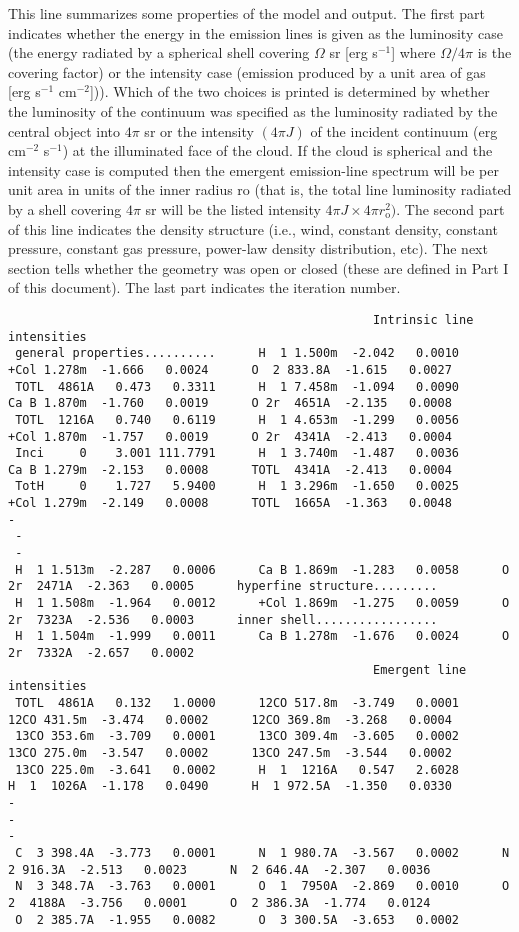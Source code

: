 This line summarizes some properties of the model and output.
The first
part indicates whether the energy in the emission lines is given as the
luminosity case (the energy radiated by a spherical shell covering
$\Omega$ sr [erg s$^{-1}$] where $\Omega/4\pi$ is the covering factor)
or the intensity case (emission
produced by a unit area of gas [erg s$^{-1}$ cm$^{-2}$])).
Which of the two choices
is printed is determined by whether the luminosity of the continuum was
specified as the luminosity radiated by the central object into $4\pi$ sr
or
the intensity $(4\pi J)$ of the incident continuum (erg cm$^{-2}$ s$^{-1}$) at the
illuminated face of the cloud.
If the cloud is spherical and the intensity
case is computed then the emergent emission-line spectrum will be per unit
area in units of the inner radius ro (that is, the total line luminosity
radiated by a shell covering $4\pi$ sr will be the listed intensity
$4\pi J \times 4\pi r_{\mathrm{o}}^2)$.
The second part of this line indicates the density structure (i.e.,
wind, constant density, constant pressure, constant gas pressure, power-law
density distribution, etc).
The next section tells whether the geometry
was open or closed (these are defined in Part I of this document).
The last part indicates the iteration number.
{\setverbatimfontsize{\tiny}
\begin{verbatim}
                                                   Intrinsic line intensities
 general properties..........      H  1 1.500m  -2.042   0.0010      +Col 1.278m  -1.666   0.0024      O  2 833.8A  -1.615   0.0027
 TOTL  4861A   0.473   0.3311      H  1 7.458m  -1.094   0.0090      Ca B 1.870m  -1.760   0.0019      O 2r  4651A  -2.135   0.0008
 TOTL  1216A   0.740   0.6119      H  1 4.653m  -1.299   0.0056      +Col 1.870m  -1.757   0.0019      O 2r  4341A  -2.413   0.0004
 Inci     0    3.001 111.7791      H  1 3.740m  -1.487   0.0036      Ca B 1.279m  -2.153   0.0008      TOTL  4341A  -2.413   0.0004
 TotH     0    1.727   5.9400      H  1 3.296m  -1.650   0.0025      +Col 1.279m  -2.149   0.0008      TOTL  1665A  -1.363   0.0048
-
 -
 -
 H  1 1.513m  -2.287   0.0006      Ca B 1.869m  -1.283   0.0058      O 2r  2471A  -2.363   0.0005      hyperfine structure.........
 H  1 1.508m  -1.964   0.0012      +Col 1.869m  -1.275   0.0059      O 2r  7323A  -2.536   0.0003      inner shell.................
 H  1 1.504m  -1.999   0.0011      Ca B 1.278m  -1.676   0.0024      O 2r  7332A  -2.657   0.0002
                                                   Emergent line intensities
 TOTL  4861A   0.132   1.0000      12CO 517.8m  -3.749   0.0001      12CO 431.5m  -3.474   0.0002      12CO 369.8m  -3.268   0.0004
 13CO 353.6m  -3.709   0.0001      13CO 309.4m  -3.605   0.0002      13CO 275.0m  -3.547   0.0002      13CO 247.5m  -3.544   0.0002
 13CO 225.0m  -3.641   0.0002      H  1  1216A   0.547   2.6028           H  1  1026A  -1.178   0.0490      H  1 972.5A  -1.350   0.0330
-
-
-
 C  3 398.4A  -3.773   0.0001      N  1 980.7A  -3.567   0.0002      N  2 916.3A  -2.513   0.0023      N  2 646.4A  -2.307   0.0036
 N  3 348.7A  -3.763   0.0001      O  1  7950A  -2.869   0.0010      O  2  4188A  -3.756   0.0001      O  2 386.3A  -1.774   0.0124
 O  2 385.7A  -1.955   0.0082      O  3 300.5A  -3.653   0.0002
\end{verbatim}
}

